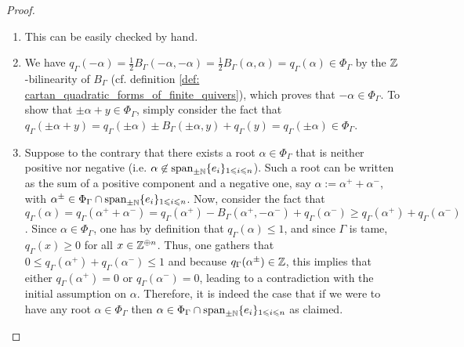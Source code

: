                 \begin{proof}
                    \noindent
                    \begin{enumerate}
                        \item This can be easily checked by hand.
                        \item We have $q_{\Gamma}(-\alpha) = \frac12 B_{\Gamma}(-\alpha, -\alpha) = \frac12 B_{\Gamma}(\alpha, \alpha) = q_{\Gamma}(\alpha) \in \Phi_{\Gamma}$ by the $\mathbb{Z}$-bilinearity of $B_{\Gamma}$ (cf. definition \ref{def: cartan_quadratic_forms_of_finite_quivers}), which proves that $-\alpha \in \Phi_{\Gamma}$. To show that $\pm\alpha + y \in \Phi_{\Gamma}$, simply consider the fact that $q_{\Gamma}(\pm\alpha + y) = q_{\Gamma}(\pm\alpha) \pm B_{\Gamma}(\pm \alpha, y) + q_{\Gamma}(y) = q_{\Gamma}(\pm\alpha) \in \Phi_{\Gamma}$.
                        \item Suppose to the contrary that there exists a root $\alpha \in \Phi_{\Gamma}$ that is neither positive nor negative (i.e. $\alpha \not \in \operatorname{span}_{\pm \mathbb{N}} \{e_i\}_{1 \leqslant i \leqslant n}$). Such a root can be written as the sum of a positive component and a negative one, say $\alpha := \alpha^+ + \alpha^-$, with $\alpha^{\pm} \in \Phi_{\Gamma} \cap \operatorname{span}_{\pm \mathbb{N}} \{e_i\}_{1 \leqslant i \leqslant n}$. Now, consider the fact that $q_{\Gamma}(\alpha) = q_{\Gamma}(\alpha^+ + \alpha^-) = q_{\Gamma}(\alpha^+) - B_{\Gamma}(\alpha^+, -\alpha^-) + q_{\Gamma}(\alpha^-) \geq q_{\Gamma}(\alpha^+) + q_{\Gamma}(\alpha^-)$. Since $\alpha \in \Phi_{\Gamma}$, one has by definition that $q_{\Gamma}(\alpha) \leq 1$, and since $\Gamma$ is tame, $q_{\Gamma}(x) \geq 0$ for all $x \in \mathbb{Z}^{\oplus n}$. Thus, one gathers that $0 \leq q_{\Gamma}(\alpha^+) + q_{\Gamma}(\alpha^-) \leq 1$ and because $q_{\Gamma}(\alpha^{\pm}) \in \mathbb{Z}$, this implies that either $q_{\Gamma}(\alpha^+) = 0$ or $q_{\Gamma}(\alpha^-) = 0$, leading to a contradiction with the initial assumption on $\alpha$. Therefore, it is indeed the case that if we were to have any root $\alpha \in \Phi_{\Gamma}$ then $\alpha \in \Phi_{\Gamma} \cap \operatorname{span}_{\pm \mathbb{N}} \{e_i\}_{1 \leqslant i \leqslant n}$ as claimed. 
                    \end{enumerate}
                \end{proof}
                
